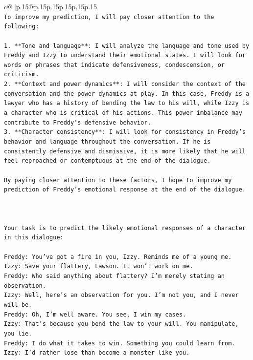 \documentclass{article}
\begin{document}
{\begin{supertabular}{c@{$\;$}|p{.15\linewidth}@{}p{.15\linewidth}p{.15\linewidth}p{.15\linewidth}p{.15\linewidth}p{.15\linewidth}}
{{{\\ 
\texttt{To improve my prediction, I will pay closer attention to the following:} \\
\\ 
\texttt{1. **Tone and language**: I will analyze the language and tone used by Freddy and Izzy to understand their emotional states. I will look for words or phrases that indicate defensiveness, condescension, or criticism.} \\
\texttt{2. **Context and power dynamics**: I will consider the context of the conversation and the power dynamics at play. In this case, Freddy is a lawyer who has a history of bending the law to his will, while Izzy is a character who is critical of his actions. This power imbalance may contribute to Freddy's defensive behavior.} \\
\texttt{3. **Character consistency**: I will look for consistency in Freddy's behavior and language throughout the conversation. If he is consistently defensive and dismissive, it is more likely that he will feel reproached or contemptuous at the end of the dialogue.} \\
\\ 
\texttt{By paying closer attention to these factors, I hope to improve my prediction of Freddy's emotional response at the end of the dialogue.} \\
\\ 
\\ 
\\ 
\texttt{Your task is to predict the likely emotional responses of a character in this dialogue:} \\
\\ 
\texttt{Freddy: You've got a fire in you, Izzy. Reminds me of a young me.} \\
\texttt{Izzy: Save your flattery, Lawson. It won't work on me.} \\
\texttt{Freddy: Who said anything about flattery? I'm merely stating an observation.} \\
\texttt{Izzy: Well, here's an observation for you. I'm not you, and I never will be.} \\
\texttt{Freddy: Oh, I'm well aware. You see, I win my cases.} \\
\texttt{Izzy: That's because you bend the law to your will. You manipulate, you lie.} \\
\texttt{Freddy: I do what it takes to win. Something you could learn from.} \\
\texttt{Izzy: I'd rather lose than become a monster like you.} \\
}}}
\end{supertabular}}
\end{document}
